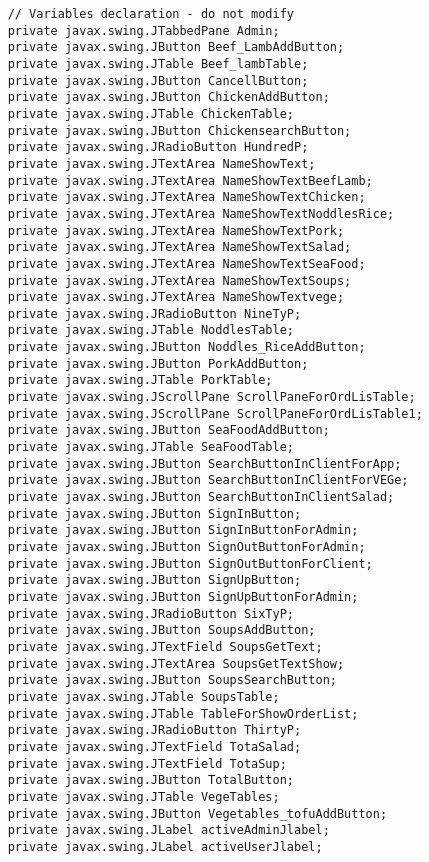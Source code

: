 \documentclass[12pt,a4paper]{article}
\begin{document}
\begin{lstlisting}
    // Variables declaration - do not modify                     
    private javax.swing.JTabbedPane Admin;
    private javax.swing.JButton Beef_LambAddButton;
    private javax.swing.JTable Beef_lambTable;
    private javax.swing.JButton CancellButton;
    private javax.swing.JButton ChickenAddButton;
    private javax.swing.JTable ChickenTable;
    private javax.swing.JButton ChickensearchButton;
    private javax.swing.JRadioButton HundredP;
    private javax.swing.JTextArea NameShowText;
    private javax.swing.JTextArea NameShowTextBeefLamb;
    private javax.swing.JTextArea NameShowTextChicken;
    private javax.swing.JTextArea NameShowTextNoddlesRice;
    private javax.swing.JTextArea NameShowTextPork;
    private javax.swing.JTextArea NameShowTextSalad;
    private javax.swing.JTextArea NameShowTextSeaFood;
    private javax.swing.JTextArea NameShowTextSoups;
    private javax.swing.JTextArea NameShowTextvege;
    private javax.swing.JRadioButton NineTyP;
    private javax.swing.JTable NoddlesTable;
    private javax.swing.JButton Noddles_RiceAddButton;
    private javax.swing.JButton PorkAddButton;
    private javax.swing.JTable PorkTable;
    private javax.swing.JScrollPane ScrollPaneForOrdLisTable;
    private javax.swing.JScrollPane ScrollPaneForOrdLisTable1;
    private javax.swing.JButton SeaFoodAddButton;
    private javax.swing.JTable SeaFoodTable;
    private javax.swing.JButton SearchButtonInClientForApp;
    private javax.swing.JButton SearchButtonInClientForVEGe;
    private javax.swing.JButton SearchButtonInClientSalad;
    private javax.swing.JButton SignInButton;
    private javax.swing.JButton SignInButtonForAdmin;
    private javax.swing.JButton SignOutButtonForAdmin;
    private javax.swing.JButton SignOutButtonForClient;
    private javax.swing.JButton SignUpButton;
    private javax.swing.JButton SignUpButtonForAdmin;
    private javax.swing.JRadioButton SixTyP;
    private javax.swing.JButton SoupsAddButton;
    private javax.swing.JTextField SoupsGetText;
    private javax.swing.JTextArea SoupsGetTextShow;
    private javax.swing.JButton SoupsSearchButton;
    private javax.swing.JTable SoupsTable;
    private javax.swing.JTable TableForShowOrderList;
    private javax.swing.JRadioButton ThirtyP;
    private javax.swing.JTextField TotaSalad;
    private javax.swing.JTextField TotaSup;
    private javax.swing.JButton TotalButton;
    private javax.swing.JTable VegeTables;
    private javax.swing.JButton Vegetables_tofuAddButton;
    private javax.swing.JLabel activeAdminJlabel;
    private javax.swing.JLabel activeUserJlabel;

\end{lstlisting}
\end{document}
